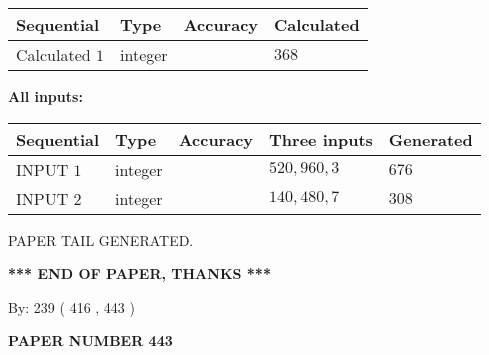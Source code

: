 \documentclass{ctexart}
\begin{document}
   
   
   
\noindent{}
   
   
  
  
\noindent\begin{tabular}{|l|l|l|l|}
\hline
 Sequential & Type & Accuracy & Calculated \\ 
\hline
 
 
  Calculated $  1 $ & integer &  & 
  $ 368 $ 
 \\  \hline  
 \end{tabular}
   
   
   
   
\noindent\vspace{0.1in}\hspace{-0.08in} {\textbf{\Large{All inputs: }}}
   
   
  
  
\noindent\begin{tabular}{|l|l|l|l|l|}
\hline
 Sequential & Type & Accuracy & Three inputs & Generated \\ 
\hline
 
 
  INPUT $  1 $ & integer &  & $
 520
 , 
 960
 , 
 3
 $ & $ 676 $ 
 \\  \hline  
 
 
  INPUT $  2 $ & integer &  & $
 140
 , 
 480
 , 
 7
 $ & $ 308 $ 
 \\  \hline  
 \end{tabular}
   
   
   
   
   
   
 \vspace{0.2in}
 
   
   
\vspace{2.0in} PAPER TAIL GENERATED.
   
   
   
   
\vspace{1.0in} 
{\textbf{\large{ *** END OF PAPER, THANKS *** }}} 
   
   
\hspace{1.0in} By: 
 239 ( 416 ,  443 )
   
   
   
   
\newpage 
\setcounter{page}{ 
   443001 } 
   
   
   
   
 {\textbf{ \Large{ PAPER NUMBER  443  }}}
   
\end{document}
